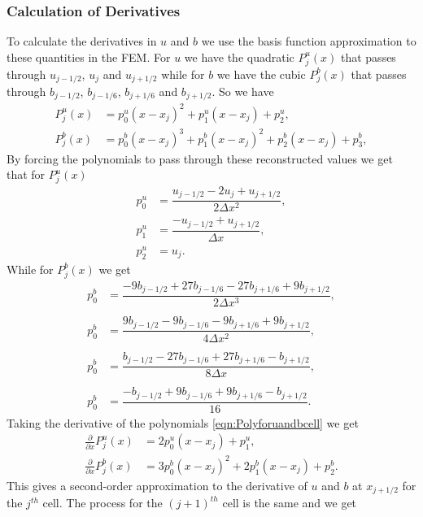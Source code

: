 \subsubsection{Calculation of Derivatives}
To calculate the derivatives in $u$ and $b$ we use the basis function approximation to these quantities in the FEM. For $u$ we have the quadratic $P_j^u(x)$ that passes through $u_{j-1/2}$, $u_j$ and $u_{j+1/2}$ while for $b$ we have the cubic $P_j^b(x)$ that passes through $b_{j-1/2}$, $b_{j-1/6}$, $b_{j+1/6}$ and $b_{j+1/2}$. So we have 
\begin{subequations}
	\begin{align}
	P^u_j(x) &= p^u_0 \left(x - x_j\right)^2 + p^u_1 \left(x - x_j\right) + p^u_2, \\
	P^b_j(x) &= p^b_0 \left(x - x_j\right)^3 + p^b_1 \left(x - x_j\right)^2 + p^b_2 \left(x - x_j\right)  + p^b_3,
	\end{align}
	\label{eqn:Polyforuandbcell}
\end{subequations}
By forcing the polynomials to pass through these reconstructed values we get that for $P^u_j(x)$
\begin{align*}
p^u_0 &=  \dfrac{u_{j-1/2} - 2u_j + u_{j+1/2}}{2 \Delta x^2},\\
p^u_1 &=  \dfrac{-u_{j-1/2} + u_{j+1/2}}{\Delta x},\\
p^u_2 &=  u_j.
\end{align*}
While for $P^b_j(x)$ we get
\begin{align*}
p^b_0 &=  \dfrac{-9b_{j-1/2} + 27b_{j-1/6} - 27 b_{j+1/6} + 9b_{j+1/2}}{2 \Delta x^3},\\ \\
p^b_0 &=  \dfrac{9b_{j-1/2} - 9b_{j-1/6} - 9b_{j+1/6} + 9b_{j+1/2}}{4 \Delta x^2},\\ \\ 
p^b_0 &=  \dfrac{b_{j-1/2} - 27b_{j-1/6} + 27 b_{j+1/6} - b_{j+1/2}}{8 \Delta x},\\\\
p^b_0 &=  \dfrac{-b_{j-1/2}  + 9b_{j-1/6} + 9 b_{j+1/6} - b_{j+1/2}}{16}.
\end{align*}
Taking the derivative of the polynomials \eqref{eqn:Polyforuandbcell} we get
	\begin{align*}
	\frac{\partial }{\partial x}P^u_j(x) &= 2p^u_0 \left(x - x_j\right) + p^u_1, \\
	\frac{\partial }{\partial x}P^b_j(x) &= 3p^b_0 \left(x - x_j\right)^2 + 2p^b_1 \left(x - x_j\right) + p^b_2.
	\end{align*}
This gives a second-order approximation to the derivative of $u$ and $b$ at $x_{j+1/2}$ for the $j^{th}$ cell. The process for the $(j+1)^{th}$ cell is the same and we get 

